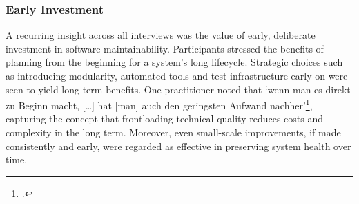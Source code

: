 \subsubsection{Early Investment}
A recurring insight across all interviews was the value of early, deliberate investment in software maintainability. Participants stressed the benefits of planning from the beginning for a system's long lifecycle. Strategic choices such as introducing modularity, automated tools and test infrastructure early on were seen to yield long-term benefits.
One practitioner noted that `wenn man es direkt zu Beginn macht, [\ldots] hat [man] auch den geringsten Aufwand nachher'\footcite{interview3}, capturing the concept that frontloading technical quality reduces costs and complexity in the long term. Moreover, even small-scale improvements, if made consistently and early, were regarded as effective in preserving system health over time.\\

